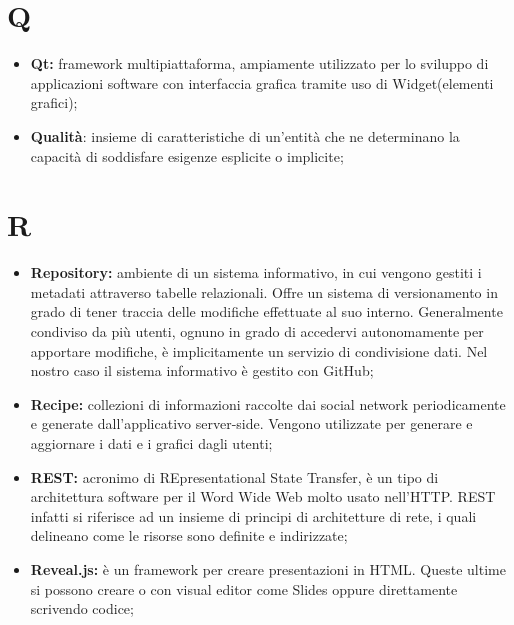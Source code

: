 \section*{\Huge Q} %
\label{sec:q}
	\begin{itemize}
		\item \textbf{Qt:} framework multipiattaforma, ampiamente utilizzato per lo sviluppo di applicazioni software con interfaccia grafica tramite uso di Widget(elementi grafici);
		\item \textbf{Qualità}: insieme di caratteristiche di un'entità che ne determinano la capacità di soddisfare esigenze esplicite o implicite;	
	\end{itemize}
\pagebreak

\section*{\Huge R} %
\label{sec:r}
	\begin{itemize}
		\item \textbf{Repository:} ambiente di un sistema informativo, in cui vengono gestiti i metadati attraverso tabelle relazionali. Offre un sistema di versionamento in grado di tener traccia delle modifiche effettuate al suo interno. Generalmente condiviso da più utenti, ognuno in grado di accedervi autonomamente per apportare modifiche, è implicitamente un servizio di condivisione dati. Nel nostro caso il sistema informativo è gestito con GitHub;	
		\item \textbf{Recipe:} collezioni di informazioni raccolte dai social network periodicamente e generate dall'applicativo server-side. Vengono utilizzate per generare e aggiornare i dati e i grafici dagli utenti;
		\item \textbf{REST:} acronimo di REpresentational State Transfer, è un tipo di architettura software per il Word Wide Web molto usato nell'HTTP. REST infatti si riferisce ad un insieme di principi di architetture di rete, i quali delineano come le risorse sono definite e indirizzate;
		\item \textbf{Reveal.js:} è un framework per creare presentazioni in HTML. Queste ultime si possono creare o con visual editor come Slides oppure direttamente scrivendo codice;
		\end{itemize}
\pagebreak


